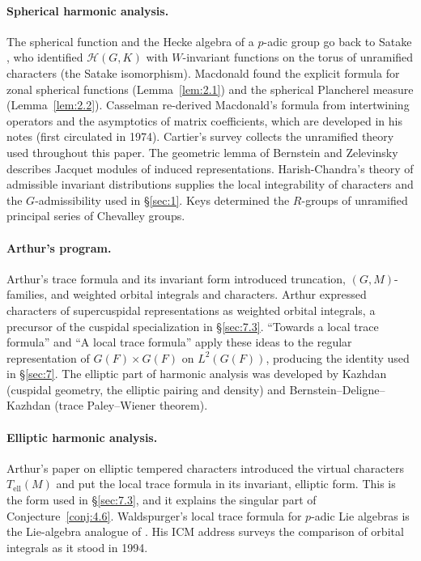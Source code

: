 \documentclass[12pt,letterpaper]{article}
\numberwithin{equation}{section}
\theoremstyle{plain}
\theoremstyle{remark}
\theoremstyle{plain}
\theoremstyle{definition}
\theoremstyle{remark}
\newcounter{rtw}
\theoremstyle{remark}
\newcommand{\Hc}{\mathcal{H}}
\newcommand{\ellr}{\mathrm{ell}}
\begin{document}
\paragraph{Spherical harmonic analysis.} The spherical function and the Hecke algebra of a $p$-adic group go back to Satake \cite{Sa63}, who identified $\Hc(G,K)$ with $W$-invariant functions on the torus of unramified characters (the Satake isomorphism). Macdonald \cite{Ma71} found the explicit formula for zonal spherical functions (Lemma~\ref{lem:2.1}) and the spherical Plancherel measure (Lemma~\ref{lem:2.2}). Casselman \cite{Ca80} re-derived Macdonald's formula from intertwining operators and the asymptotics of matrix coefficients, which are developed in his notes \cite{Ca95} (first circulated in 1974). Cartier's survey \cite{Ca79} collects the unramified theory used throughout this paper. The geometric lemma of Bernstein and Zelevinsky \cite{BZ77} describes Jacquet modules of induced representations. Harish-Chandra's theory of admissible invariant distributions \cite{HC78} supplies the local integrability of characters and the $G$-admissibility used in \S\ref{sec:1}. Keys \cite{Ke82} determined the $R$-groups of unramified principal series of Chevalley groups.

\paragraph{Arthur's program.} Arthur's trace formula \cite{Ar78} and its invariant form \cite{Ar81,Ar88} introduced truncation, $(G,M)$-families, and weighted orbital integrals and characters. Arthur \cite{Ar87} expressed characters of supercuspidal representations as weighted orbital integrals, a precursor of the cuspidal specialization in \S\ref{sec:7.3}. ``Towards a local trace formula'' \cite{Ar89} and ``A local trace formula'' \cite{Ar91} apply these ideas to the regular representation of $G(F)\times G(F)$ on $L^2(G(F))$, producing the identity used in \S\ref{sec:7}. The elliptic part of harmonic analysis was developed by Kazhdan \cite{Ka86} (cuspidal geometry, the elliptic pairing and density) and Bernstein--Deligne--Kazhdan \cite{BDK86} (trace Paley--Wiener theorem).

\paragraph{Elliptic harmonic analysis.} Arthur's paper on elliptic tempered characters \cite{Ar93} introduced the virtual characters $T_{\ellr}(M)$ and put the local trace formula in its invariant, elliptic form. This is the form used in \S\ref{sec:7.3}, and it explains the singular part of Conjecture~\ref{conj:4.6}. Waldspurger's local trace formula for $p$-adic Lie algebras \cite{Wa95a} is the Lie-algebra analogue of \cite{Ar91}. His ICM address \cite{Wa95b} surveys the comparison of orbital integrals as it stood in 1994.
\end{document}
